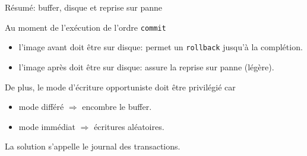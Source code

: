 \begin{frame}{Résumé: buffer, disque et reprise sur panne}

Au moment de l'exécution de l'ordre \texttt{commit}


\begin{itemize}

  \item \alert{l'image avant doit être sur disque}: permet un \texttt{rollback} jusqu'à la complétion.

  \item \alert{l'image après} doit être sur disque: assure la reprise sur panne  (légère).

\end{itemize}

\vfill

De plus, le mode d'écriture opportuniste doit être privilégié car

\vfill

\begin{itemize}

  \item  mode différé $\Rightarrow$ encombre le buffer.  

  \item  mode immédiat $\Rightarrow$  écritures aléatoires.

\end{itemize}

\vfill

\begin{block}{}
La solution s'appelle le \alert{journal des transactions}.
\end{block}


\end{frame}



